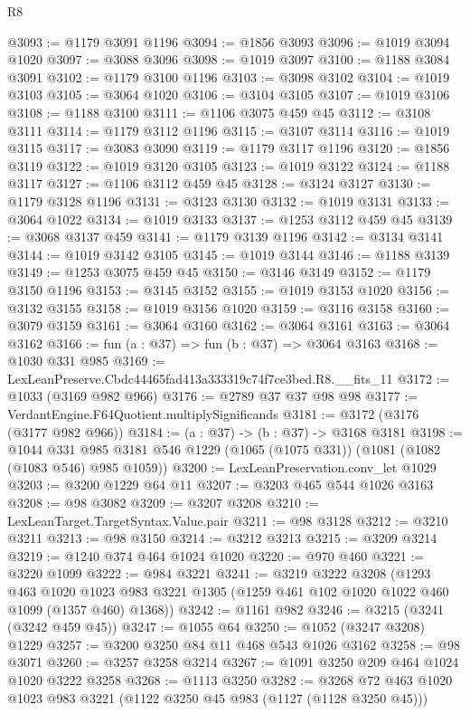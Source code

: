 \begin{lexlean}{R8}
\begin{coremodule}
@3093 := @1179 @3091 @1196
@3094 := @1856 @3093
@3096 := @1019 @3094 @1020
@3097 := @3088 @3096
@3098 := @1019 @3097
@3100 := @1188 @3084 @3091
@3102 := @1179 @3100 @1196
@3103 := @3098 @3102
@3104 := @1019 @3103
@3105 := @3064 @1020
@3106 := @3104 @3105
@3107 := @1019 @3106
@3108 := @1188 @3100
@3111 := @1106 @3075 @459 @45
@3112 := @3108 @3111
@3114 := @1179 @3112 @1196
@3115 := @3107 @3114
@3116 := @1019 @3115
@3117 := @3083 @3090
@3119 := @1179 @3117 @1196
@3120 := @1856 @3119
@3122 := @1019 @3120 @3105
@3123 := @1019 @3122
@3124 := @1188 @3117
@3127 := @1106 @3112 @459 @45
@3128 := @3124 @3127
@3130 := @1179 @3128 @1196
@3131 := @3123 @3130
@3132 := @1019 @3131
@3133 := @3064 @1022
@3134 := @1019 @3133
@3137 := @1253 @3112 @459 @45
@3139 := @3068 @3137 @459
@3141 := @1179 @3139 @1196
@3142 := @3134 @3141
@3144 := @1019 @3142 @3105
@3145 := @1019 @3144
@3146 := @1188 @3139
@3149 := @1253 @3075 @459 @45
@3150 := @3146 @3149
@3152 := @1179 @3150 @1196
@3153 := @3145 @3152
@3155 := @1019 @3153 @1020
@3156 := @3132 @3155
@3158 := @1019 @3156 @1020
@3159 := @3116 @3158
@3160 := @3079 @3159
@3161 := @3064 @3160
@3162 := @3064 @3161
@3163 := @3064 @3162
@3166 := fun (a : @37) => fun (b : @37) => @3064 @3163
@3168 := @1030 @331 @985
@3169 := LexLeanPreserve.Cbdc44465fad413a333319c74f7ce3bed.R8.__fits_11
@3172 := @1033 (@3169 @982 @966)
@3176 := @2789 @37 @37 @98 @98
@3177 := VerdantEngine.F64Quotient.multiplySignificands
@3181 := @3172 (@3176 (@3177 @982 @966))
@3184 := (a : @37) -> (b : @37) -> @3168 @3181
@3198 := @1044
    @331
    @985
    @3181
    @546
    @1229
    (@1065 (@1075 @331))
    (@1081 (@1082 (@1083 @546) @985 @1059))
@3200 := LexLeanPreservation.conv_let @1029
@3203 := @3200 @1229 @64 @11
@3207 := @3203 @465 @544 @1026 @3163
@3208 := @98 @3082
@3209 := @3207 @3208
@3210 := LexLeanTarget.TargetSyntax.Value.pair
@3211 := @98 @3128
@3212 := @3210 @3211
@3213 := @98 @3150
@3214 := @3212 @3213
@3215 := @3209 @3214
@3219 := @1240 @374 @464 @1024 @1020
@3220 := @970 @460
@3221 := @3220 @1099
@3222 := @984 @3221
@3241 := @3219
    @3222
    @3208
    (@1293
      @463
      @1020
      @1023
      @983
      @3221
      @1305
      (@1259 @461 @102 @1020 @1022 @460 @1099 (@1357 @460) @1368))
@3242 := @1161 @982
@3246 := @3215 (@3241 (@3242 @459 @45))
@3247 := @1055 @64
@3250 := @1052 (@3247 @3208) @1229
@3257 := @3200 @3250 @84 @11 @468 @543 @1026 @3162
@3258 := @98 @3071
@3260 := @3257 @3258 @3214
@3267 := @1091 @3250 @209 @464 @1024 @1020 @3222 @3258
@3268 := @1113 @3250
@3282 := @3268 @72 @463 @1020 @1023 @983 @3221 (@1122 @3250 @45 @983 (@1127 (@1128 @3250 @45)))

\end{coremodule}
\end{lexlean}
